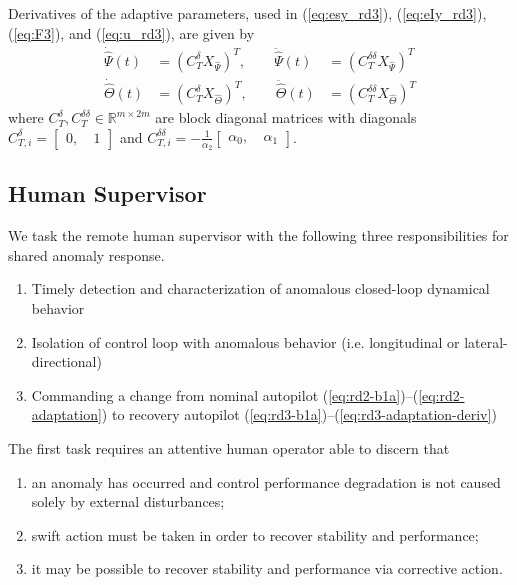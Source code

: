 \documentclass[english]{ifacconf}
\begin{document}
Derivatives of the adaptive parameters, used in (\ref{eq:esy_rd3}), (\ref{eq:eIy_rd3}), (\ref{eq:F3}), and (\ref{eq:u_rd3}), are given by
\begin{equation}
\begin{aligned}
	\dot{\hat{\Psi}}(t) &= (C_T^\delta X_{\hat{\Psi}})^T, \qquad \ddot{\hat{\Psi}}(t) &= (C_T^{\delta\delta}X_{\hat{\Psi}})^T \\
	\dot{\hat{\Theta}}(t) &= (C_T^\delta X_{\hat{\Theta}})^T, \qquad \ddot{\hat{\Theta}}(t) &= (C_T^{\delta\delta}X_{\hat{\Theta}})^T
\end{aligned} \label{eq:rd3-adaptation-deriv}
\end{equation}
where $C_T^{\delta}, C_T^{\delta \delta} \in \mathbb{R}^{m \times 2m}$ are block diagonal matrices with diagonals $C_{T,i}^{\delta} = \begin{bmatrix} 0,~ & 1	\end{bmatrix}$ and $C_{T,i}^{\delta\delta} = -\frac{1}{\alpha_2}\begin{bmatrix} \alpha_0,~ & \alpha_1 \end{bmatrix}$. 

\subsection{Human Supervisor}\label{subsec:sc_human}
We task the remote human supervisor with the following three responsibilities for shared anomaly response.
\begin{enumerate}[label=Task \arabic*., leftmargin=1.4cm]
	\item Timely detection and characterization of anomalous closed-loop dynamical behavior
	\item Isolation of control loop with anomalous behavior (i.e. longitudinal or lateral-directional)
	\item Commanding a change from nominal autopilot (\ref{eq:rd2-b1a})--(\ref{eq:rd2-adaptation}) to recovery autopilot (\ref{eq:rd3-b1a})--(\ref{eq:rd3-adaptation-deriv})
\end{enumerate}

The first task requires an attentive human operator able to discern that 
\begin{enumerate}[label=(\alph*)]
	\item an anomaly has occurred and control performance degradation is not caused solely by external disturbances;
	\item swift action must be taken in order to recover stability and performance;
	\item it may be possible to recover stability and performance via corrective action.
\end{enumerate}
\end{document}
